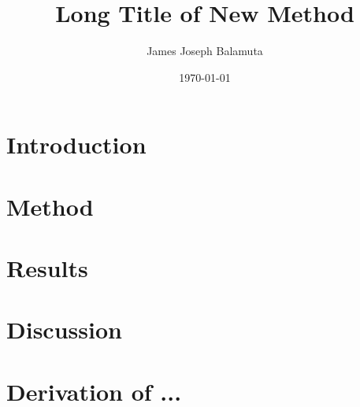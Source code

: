 \documentclass[man,12pt,floatsintext,apacite,noextraspace,longtable]{apa6}
\title{Long Title of New Method}
\author[1]{James Joseph Balamuta}
\affil[1]{Department of A \\ University of XYZ\\ email@univ.edu }
\affiliation{~} %
\date{\today}
\theoremstyle{plain}
\begin{document}
\maketitle

\section{Introduction}



\section{Method}



\section{Results}



\section{Discussion}




\appendix


\renewcommand{\theequation}{A\arabic{equation}}    
\setcounter{equation}{0}  %

\section{Derivation of ...}
\label{appendix:values}

  
\end{document}
